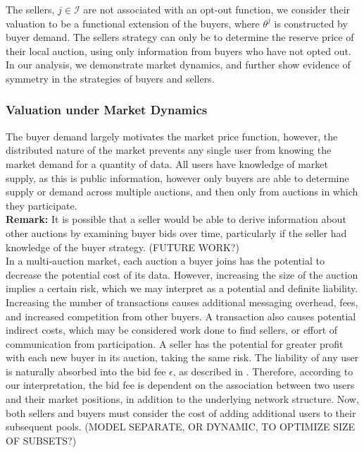 \documentclass[sigconf, anonymous]{acmart}
\newcommand{\mcI}{\mathcal{I}}
\theoremstyle{definition}
\begin{document}
The sellers, $j\in\mcI$ are not associated with an opt-out function, we
consider their valuation to be a functional extension of the buyers, where
$\theta^j$ is constructed by buyer demand.
The sellers strategy can only be to determine the reserve price of their local
auction, using only information from buyers who have not opted out.
In our analysis, we demonstrate market dynamics, and further show evidence of symmetry in the strategies of
buyers and sellers.

\subsubsection{Valuation under Market Dynamics}
The buyer demand largely motivates the market price function, however, the
distributed nature of the market prevents any single user from knowing the
market demand for a quantity of data. All users have knowledge of market
supply, as this is public information, however only buyers
are able to determine supply or demand across multiple auctions, and then only from auctions
in which they participate. \\
\textbf{Remark:}
It is possible that a seller would be able to derive information about other
auctions by examining buyer bids over time, particularly if the seller had knowledge of the
buyer strategy. (FUTURE WORK?)\\

In a multi-auction market, each auction a buyer joins has the potential to
decrease the potential cost of its data. However, increasing the size of the
auction implies a certain risk, which we may interpret as a potential and
definite
liability. Increasing the number of transactions causes additional messaging
overhead, fees, and increased competition from other buyers. 
A transaction also causes potential indirect costs, which may be considered work done to find
sellers, or effort of communication from participation. A seller
has the potential for greater profit with each new buyer in its auction, taking 
the same risk.
The liability of any user is naturally absorbed into the bid fee $\epsilon$,
as described in \cite{semret}. Therefore, according to our interpretation, the bid fee is
dependent on the association between two users and their market positions, in
addition to the underlying network structure. Now, both sellers and buyers must consider
the cost of adding additional users to their subsequent pools. (MODEL SEPARATE,
OR DYNAMIC, TO OPTIMIZE SIZE OF SUBSETS?)
\end{document}

